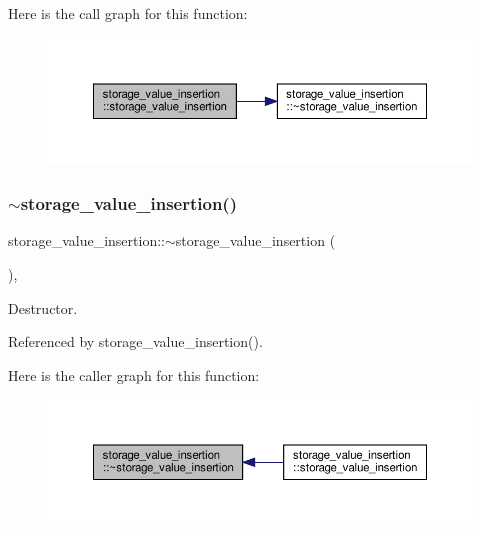 Here is the call graph for this function\+:
\nopagebreak
\begin{figure}[H]
\begin{center}
\leavevmode
\includegraphics[width=350pt]{d3/d41/classstorage__value__insertion_a1410b828a19550cfa7821e33369dfcc8_cgraph}
\end{center}
\end{figure}
\mbox{\label{classstorage__value__insertion_a9695d583f283722d12d7c687b0529a8f}} 
\subsubsection{\texorpdfstring{$\sim$storage\+\_\+value\+\_\+insertion()}{~storage\_value\_insertion()}}
{\footnotesize\ttfamily storage\+\_\+value\+\_\+insertion\+::$\sim$storage\+\_\+value\+\_\+insertion (\begin{DoxyParamCaption}{ }\end{DoxyParamCaption})\hspace{0.3cm}{\ttfamily [override]}, {\ttfamily [default]}}



Destructor. 



Referenced by storage\+\_\+value\+\_\+insertion().

Here is the caller graph for this function\+:
\nopagebreak
\begin{figure}[H]
\begin{center}
\leavevmode
\includegraphics[width=350pt]{d3/d41/classstorage__value__insertion_a9695d583f283722d12d7c687b0529a8f_icgraph}
\end{center}
\end{figure}



